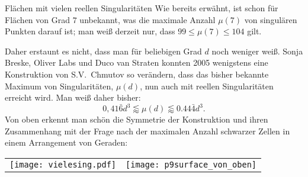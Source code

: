 \begin{surferPage}[216 Singularitäten]{Flächen mit vielen reellen Singularitäten}
  Wie bereits erwähnt, ist schon für Flächen von Grad $7$ unbekannt, was die
    maximale Anzahl $\mu(7)$ von singulären Punkten darauf ist; man weiß derzeit
    nur, dass $99\le \mu(7) \le 104$ gilt. 

    Daher erstaunt es nicht, dass man für beliebigen Grad $d$ noch weniger
    weiß.
    Sonja Breske, Oliver Labs und Duco van Straten konnten 2005 wenigstens eine
    Konstruktion von S.V.\ Chmutov so verändern, dass das bisher bekannte
    Maximum von Singularitäten, $\mu(d)$, nun auch mit reellen Singularitäten 
    erreicht wird.
    Man weiß daher bisher: 
    \[0,41\bar{6}d^3 \lessapprox \mu(d) \lessapprox 0.44\bar{4} d^3.\]
    Von oben erkennt man schön die Symmetrie der Konstruktion
    und ihren Zusammenhang mit der Frage nach der maximalen Anzahl schwarzer
    Zellen in einem Arrangement von Geraden:
    \begin{center}
      \begin{tabular}{c@{\qquad}c}
        \texttt{[image: vielesing.pdf]}
        &
        \texttt{[image: p9surface\_von\_oben]}
      \end{tabular}
    \end{center}
\end{surferPage}

